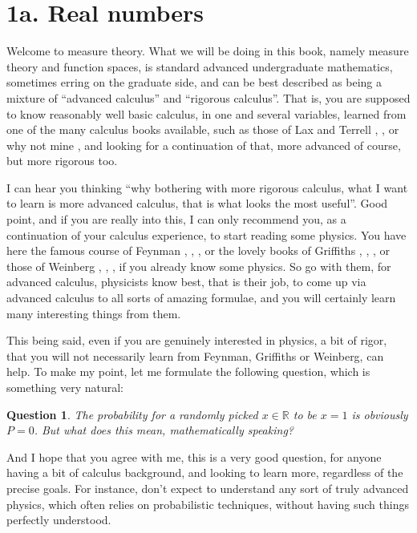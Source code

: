 \documentclass[12pt]{amsbook}
\newtheorem{question}[theorem]{Question}
\begin{document}
\section*{1a. Real numbers}

Welcome to measure theory. What we will be doing in this book, namely measure theory and function spaces, is standard advanced undergraduate mathematics, sometimes erring on the graduate side, and can be best described as being a mixture of ``advanced calculus'' and ``rigorous calculus''. That is, you are supposed to know reasonably well basic calculus, in one and several variables, learned from one of the many calculus books available, such as those of Lax and Terrell \cite{lt1}, \cite{lt2}, or why not mine \cite{ba1}, and looking for a continuation of that, more advanced of course, but more rigorous too.

\bigskip

I can hear you thinking ``why bothering with more rigorous calculus, what I want to learn is more advanced calculus, that is what looks the most useful''. Good point, and if you are really into this, I can only recommend you, as a continuation of your calculus experience, to start reading some physics. You have here the famous course of Feynman \cite{fe1}, \cite{fe2}, \cite{fe3}, or the lovely books of Griffiths \cite{gr1}, \cite{gr2}, \cite{gr3}, or those of Weinberg \cite{we1}, \cite{we2}, \cite{we3}, if you already know some physics. So go with them, for advanced calculus, physicists know best, that is their job, to come up via advanced calculus to all sorts of amazing formulae, and you will certainly learn many interesting things from them. 

\bigskip

This being said, even if you are genuinely interested in physics, a bit of rigor, that you will not necessarily learn from Feynman, Griffiths or Weinberg, can help. To make my point, let me formulate the following question, which is something very natural:

\begin{question}
The probability for a randomly picked $x\in\mathbb R$ to be $x=1$ is obviously $P=0$. But what does this mean, mathematically speaking?
\end{question} 

And I hope that you agree with me, this is a very good question, for anyone having a bit of calculus background, and looking to learn more, regardless of the precise goals. For instance, don't expect to understand any sort of truly advanced physics, which often relies on probabilistic techniques, without having such things perfectly understood.
\end{document}

